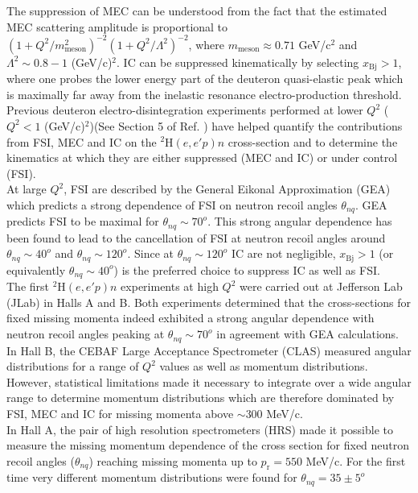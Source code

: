 The suppression of MEC can be understood from the fact that the estimated MEC scattering amplitude is proportional to  $(1 + Q^{2}/m^{2}_{\mathrm{meson}})^{-2}(1+Q^{2}/\Lambda^{2})^{-2}$, where $m_{\mathrm{meson}}\approx0.71$ GeV/c$^{2}$ and
$\Lambda^{2}\sim 0.8-1 $ (GeV/c)$^{2}$\cite{Sargsian_2001}. IC can be suppressed kinematically by selecting $x_{\mathrm{Bj}}>1$, where one probes the lower energy part of the deuteron quasi-elastic peak which is maximally far away from the inelastic resonance
electro-production threshold.\\
\indent Previous deuteron electro-disintegration experiments performed at lower $Q^{2}$ ($Q^{2}<1$ (GeV/c)$^{2}$)(See Section 5 of Ref. \cite{sargsian_2015}) have helped quantify the contributions
from FSI, MEC and IC on the $^{2}\mathrm{H}(e,e'p)n$ cross-section and to determine the kinematics at which they are either suppressed (MEC and IC) or under control (FSI).  \\
\indent At large $Q^{2}$, FSI are described by the General Eikonal Approximation (GEA)\cite{Sargsian_2001,PhysRevC.56.1124,sargsian_2015} which predicts a strong dependence of FSI on neutron recoil angles $\theta_{nq}$.
GEA predicts FSI to be maximal for $\theta_{nq}\sim70^{o}$. This strong angular dependence has been found to lead to the cancellation of FSI at neutron recoil angles around $\theta_{nq}\sim40^{o}$ and $\theta_{nq}\sim120^{o}$. Since at $\theta_{nq}\sim120^{o}$ IC are not negligible, $x_{\mathrm{Bj}}>1$ (or equivalently $\theta_{nq}\sim40^{o}$) is the preferred choice to suppress IC as well as FSI. \\
\indent The first $^{2}\mathrm{H}(e,e'p)n$ experiments at high $Q^{2}$ were carried out at Jefferson Lab (JLab) in Halls A\cite{PhysRevLett.107.262501} and B\cite{PhysRevLett.98.262502}. Both
experiments determined that the cross-sections for fixed missing momenta indeed exhibited a strong angular dependence with neutron recoil angles peaking
at $\theta_{nq} \sim 70^{o}$ in agreement with GEA\cite{Sargsian_2001,PhysRevC.56.1124} calculations. In Hall B, the CEBAF Large Acceptance Spectrometer (CLAS) measured angular
distributions for  a range of $Q^2$ values as well as momentum distributions. However, statistical limitations made it necessary to integrate over a wide angular range to determine momentum distributions
which are therefore dominated by  FSI, MEC and IC for missing momenta above $\sim 300$ MeV/c. \\
\indent In Hall A, the pair of high resolution spectrometers (HRS) made it possible to measure the missing  momentum dependence of the cross section for fixed neutron recoil angles ($\theta_{nq}$) reaching missing momenta up to $p_{\mathrm{r}}=550$ MeV/c. For the first time very different momentum distributions were found for $\theta_{nq}=35\pm5^{o}$
